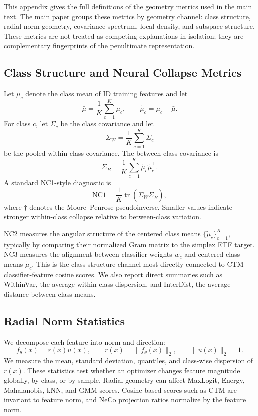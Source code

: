 This appendix gives the full definitions of the geometry metrics used in the
main text. The main paper groups these metrics by geometry channel: class
structure, radial norm geometry, covariance spectrum, local density, and
subspace structure. These metrics are not treated as competing explanations in
isolation; they are complementary fingerprints of the penultimate
representation.

\subsection{Class Structure and Neural Collapse Metrics}
\label{app:class-structure-nc}

Let \(\mu_c\) denote the class mean of ID training features and let
\[
    \bar{\mu}
    =
    \frac{1}{K}\sum_{c=1}^{K}\mu_c,
    \qquad
    \tilde{\mu}_c
    =
    \mu_c-\bar{\mu}.
\]
For class \(c\), let \(\Sigma_c\) be the class covariance and let
\[
    \Sigma_W
    =
    \frac{1}{K}\sum_{c=1}^{K}\Sigma_c
\]
be the pooled within-class covariance. The between-class covariance is
\[
    \Sigma_B
    =
    \frac{1}{K}\sum_{c=1}^{K}
    \tilde{\mu}_c \tilde{\mu}_c^\top .
\]
A standard NC1-style diagnostic is
\[
    \mathrm{NC1}
    =
    \frac{1}{K}\operatorname{tr}
    \left(\Sigma_W \Sigma_B^\dagger\right),
\]
where \(\dagger\) denotes the Moore--Penrose pseudoinverse. Smaller values
indicate stronger within-class collapse relative to between-class variation.

NC2 measures the angular structure of the centered class means
\(\{\tilde{\mu}_c\}_{c=1}^K\), typically by comparing their normalized Gram
matrix to the simplex ETF target. NC3 measures the alignment between classifier
weights \(w_c\) and centered class means \(\tilde{\mu}_c\). This is the class
structure channel most directly connected to CTM classifier-feature cosine
scores. We also report direct summaries such as WithinVar, the average
within-class dispersion, and InterDist, the average distance between class
means.

\subsection{Radial Norm Statistics}
\label{app:radial-norm-statistics}

We decompose each feature into norm and direction:
\[
    f_\theta(x)=r(x)u(x),
    \qquad
    r(x)=\|f_\theta(x)\|_2,
    \qquad
    \|u(x)\|_2=1.
\]
We measure the mean, standard deviation, quantiles, and class-wise dispersion of
\(r(x)\). These statistics test whether an optimizer changes feature magnitude
globally, by class, or by sample. Radial geometry can affect MaxLogit, Energy,
Mahalanobis, kNN, and GMM scores. Cosine-based scores such as CTM are
invariant to feature norm, and NeCo projection ratios normalize by the
feature norm.

